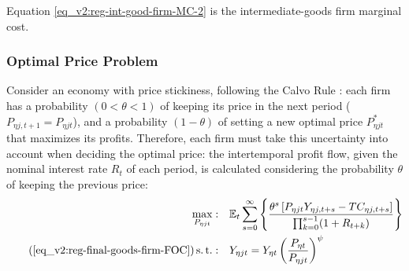 \documentclass[../thesis.tex]{subfiles}
\begin{document}
Equation \ref{eq_v2:reg-int-good-firm-MC-2} is the intermediate-goods firm marginal cost.

\begin{comment}
	
As salaries and technology are the same for all firms in region $\eta$, the $j$ index can be dropped from the marginal cost $\Lambda$:
\begin{alignat}{2}
	\Lambda_{\eta t} = \frac{W_{\eta t}}{Z_{A\eta t}} \label{eq_v2:reg-int-good-firm-prod-function}
\end{alignat}

Notice that:
\begin{align}
	TC_{\eta jt} &= W_{\eta t} L_{\eta jt} = \Lambda_{\eta t} Y_{\eta jt} 
	MC_{\eta jt} &= \frac{\partial TC_{\eta jt}}{\partial Y_{\eta jt}} = \Lambda_{\eta t} \nonumber
\end{align}

\end{comment}


\subsubsection*{Optimal Price Problem}

Consider an economy with price stickiness, following the Calvo Rule \cite{calvo_staggered_1983}: each firm has a probability $(0 < \theta < 1)$ of keeping its price in the next period ($P_{\eta j,t+1} = P_{\eta jt}$), and a probability $(1 - \theta)$ of setting a new optimal price $P_{\eta jt}^{\ast}$ that maximizes its profits. Therefore, each firm must take this uncertainty into account when deciding the optimal price: the intertemporal profit flow, given the nominal interest rate $R_{t}$ of each period, is calculated considering the probability $\theta$ of keeping the previous price:
\begin{align}
	\label{eq_v2:reg-int-good-firm-optimal-price-problem}
	\max_{P_{\eta jt}}: & \quad \E \sum_{s=0}^{\infty} \left\{ \frac{ \theta^s \left[ P_{\eta jt} Y_{\eta j,t+s} - TC_{\eta j,t+s} \right]}{\prod_{k=0}^{s-1}(1+R_{t+k})} \right\} \\
	\tag{\ref{eq_v2:reg-final-goods-firm-FOC}}
	\st: & \quad Y_{\eta jt} = Y_{\eta t} \left( \frac{P_{\eta t}}{P_{\eta jt}} \right)^{\psi}
\end{align}
\end{document}
